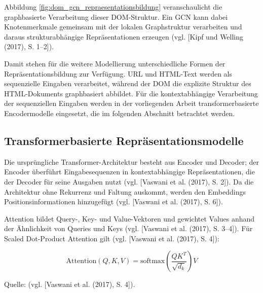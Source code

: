 Abbildung \ref{fig:dom_gcn_repraesentationsbildung} veranschaulicht die
graphbasierte Verarbeitung dieser DOM-Struktur. Ein GCN kann dabei
Knotenmerkmale gemeinsam mit der lokalen Graphstruktur verarbeiten und daraus
strukturabhängige Repräsentationen erzeugen
(vgl. [Kipf und Welling (2017), S. 1--2]).

Damit stehen für die weitere Modellierung unterschiedliche Formen der
Repräsentationsbildung zur Verfügung. URL und HTML-Text werden als
sequenzielle Eingaben verarbeitet, während der DOM die explizite Struktur
des HTML-Dokuments graphbasiert abbildet. Für die kontextabhängige
Verarbeitung der sequenziellen Eingaben werden in der vorliegenden Arbeit
transformerbasierte Encodermodelle eingesetzt, die im folgenden Abschnitt
betrachtet werden.

\subsection{Transformerbasierte Repräsentationsmodelle}
\label{sec:transformerbasierte_repraesentationsmodelle}

Die ursprüngliche Transformer-Architektur besteht aus Encoder und Decoder; der Encoder überführt Eingabesequenzen in kontextabhängige Repräsentationen, die der Decoder für seine Ausgaben nutzt (vgl. [Vaswani et al. (2017), S. 2]). Da die Architektur ohne Rekurrenz und Faltung auskommt, werden den Embeddings Positionsinformationen hinzugefügt (vgl. [Vaswani et al. (2017), S. 6]).

Attention bildet Query-, Key- und Value-Vektoren und gewichtet Values anhand der Ähnlichkeit von Queries und Keys (vgl. [Vaswani et al. (2017), S. 3--4]). Für Scaled Dot-Product Attention gilt (vgl. [Vaswani et al. (2017), S. 4]):

\begin{equation*}
\mathrm{Attention}(Q,K,V)
=
\mathrm{softmax}
\left(
\frac{QK^{T}}{\sqrt{d_k}}
\right)V
\end{equation*}

\begin{center}
    \footnotesize{Quelle: (vgl. [Vaswani et al. (2017), S. 4]).}
\end{center}

